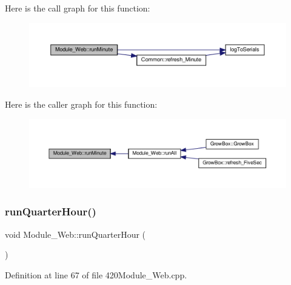 Here is the call graph for this function\+:
\nopagebreak
\begin{figure}[H]
\begin{center}
\leavevmode
\includegraphics[width=350pt]{class_module___web_a580c12222077d148fe86cd0b07b263ec_cgraph}
\end{center}
\end{figure}
Here is the caller graph for this function\+:
\nopagebreak
\begin{figure}[H]
\begin{center}
\leavevmode
\includegraphics[width=350pt]{class_module___web_a580c12222077d148fe86cd0b07b263ec_icgraph}
\end{center}
\end{figure}
\mbox{\label{class_module___web_a89d99a5091a144203cc705deda0c0426}} 
\subsubsection{\texorpdfstring{run\+Quarter\+Hour()}{runQuarterHour()}\hspace{0.1cm}{\footnotesize\ttfamily [1/2]}}
{\footnotesize\ttfamily void Module\+\_\+\+Web\+::run\+Quarter\+Hour (\begin{DoxyParamCaption}{ }\end{DoxyParamCaption})}



Definition at line 67 of file 420\+Module\+\_\+\+Web.\+cpp.

